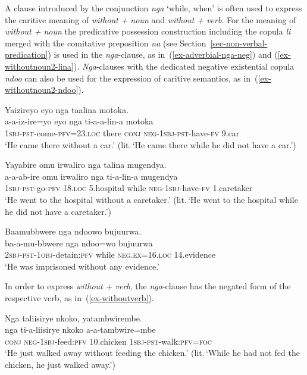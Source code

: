 A clause introduced by the conjunction \textit{nga} `while, when' is often used to express the caritive meaning of \textit{without + noun} and \textit{without + verb}.
For the meaning of \textit{without + noun} the predicative possession construction including the copula \textit{li} merged with the comitative preposition \textit{na} (see Section~\ref{sec-non-verbal-predication}) is used in the \textit{nga}-clause, as in~(\ref{ex-adverbial-nga-neg}) and (\ref{ex-withoutnoun2-lina}). 
\emph{Nga}-clauses with the dedicated negative existential copula \emph{ndoo} can also be used for the expression of caritive semantics, as in~(\ref{ex-withoutnoun2-ndoo}).

\ea \label{ex-withoutnoun2-lina}
\begin{xlist}
\ex \glll   Yaizireyo eyo nga taalina motoka.\\
	        a-a-iz-ire=yo eyo nga ti-a-a-lin-a motoka\\
	    	\textsc{1sbj}-\textsc{pst}-come-\textsc{pfv}=23.\textsc{loc} there \textsc{conj} \textsc{neg}-\textsc{1sbj}-\textsc{pst}-have-\textsc{fv} 9.car\\
	\glt ‘He came there without a car.' (lit.\,`He came there while he did not have a car.')

\ex \label{ex-withoutnoun}
	\glll   Yayabire omu irwaliro nga talina mugendya.\\
	        a-a-ab-ire		omu	irwaliro nga	ti-a-lin-a		mugendya\\ 
	    	\textsc{1sbj}-\textsc{pst}-go-\textsc{pfv} 	18\textsc{.loc}	5.hospital while	\textsc{neg}-1\textsc{sbj}-have-\textsc{fv}	1.caretaker\\
    \glt ‘He went to the hospital without a caretaker.’ (lit.\,‘He went to the hospital while he did not have a caretaker.’) 
\end{xlist}
\z

\ea \label{ex-withoutnoun2-ndoo}
    \glll Baamubbwere nga ndoowo bujuurwa.\\
    ba-a-mu-bbwere nga ndoo=wo bujuurwa\\
	2\textsc{sbj}-\textsc{pst}-1\textsc{obj}-detain:\textsc{pfv}	while	\textsc{neg.ex}=16.\textsc{loc}	14.evidence\\
	\glt ‘He was imprisoned without any evidence.’
\z

\noindent In order to express \textit{without + verb}, the \textit{nga}-clause has the negated form of the respective verb, as in~(\ref{ex-withoutverb}).

\ea \label{ex-withoutverb}
	\glll   Nga taliisirye nkoko, yatambwirembe.\\
	        nga ti-a-liisirye nkoko a-a-tambwire=mbe\\
	    	\textsc{conj} \textsc{neg}-\textsc{1sbj}-feed:\textsc{pfv} 10.chicken \textsc{1sbj}-\textsc{pst}-walk:\textsc{pfv}=\textsc{foc}\\
	\glt ‘He just walked away without feeding the chicken.' (lit.\,`While he had not fed the chicken, he just walked away.')
\z

